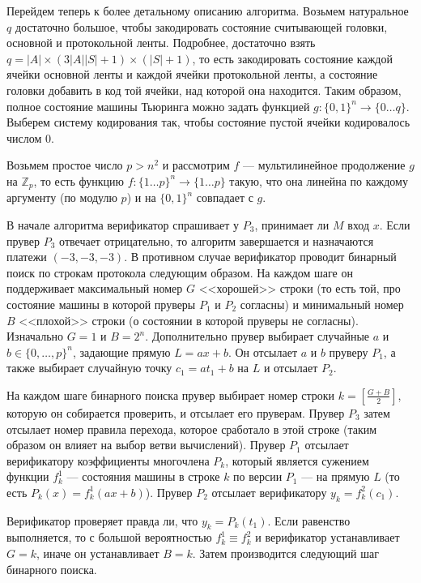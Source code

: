 \documentclass{mipt-thesis-bs}
\theoremstyle{plain}
\theoremstyle{definition}
\begin{document}
Перейдем теперь к более детальному описанию алгоритма. Возьмем натуральное $q$ достаточно большое, чтобы закодировать состояние считывающей головки, основной и протокольной ленты. Подробнее, достаточно взять $q = |A| \times (3|A||S| + 1) \times (|S| + 1)$, то есть закодировать состояние каждой ячейки основной ленты и каждой ячейки протокольной ленты, а состояние головки добавить в код той ячейки, над которой она находится. Таким образом, полное состояние машины Тьюринга можно задать функцией $g: \{0, 1\}^n \longrightarrow \{0\ldots q\}$. Выберем систему кодирования так, чтобы состояние пустой ячейки кодировалось числом 0.

Возьмем простое число $p > n^2$ и рассмотрим $f$ --- мультилинейное продолжение $g$ на $\mathbb{Z}_p$, то есть функцию $f: \{1\ldots p\}^n \longrightarrow \{1 \ldots p\}$ такую, что она линейна по каждому аргументу (по модулю $p$) и на $\{0, 1\}^n$ совпадает с $g$.

В начале алгоритма верификатор спрашивает у $P_3$, принимает ли $M$ вход $x$. Если прувер $P_3$ отвечает отрицательно, то алгоритм завершается и назначаются платежи $(-3, -3, -3)$.
В противном случае верификатор проводит бинарный поиск по строкам протокола следующим образом. На каждом шаге он поддерживает максимальный номер $G$ <<хорошей>> строки (то есть той, про состояние машины в которой пруверы $P_1$ и $P_2$ согласны) и минимальный номер $B$ <<плохой>> строки (о состоянии в которой пруверы не согласны). Изначально $G=1$ и $B=2^n$. Дополнительно прувер выбирает случайные $a$ и $b \in \{0, \ldots, p\}^n$, задающие прямую $L=ax + b$. Он отсылает $a$ и $b$ пруверу $P_1$, а также выбирает случайную точку $c_1 = a t_1 + b$ на $L$ и отсылает $P_2$.

На каждом шаге бинарного поиска прувер выбирает номер строки $k = \left[\frac{G + B}{2}\right]$, которую он собирается проверить, и отсылает его пруверам. Прувер $P_3$ затем отсылает номер правила перехода, которое сработало в этой строке (таким образом он влияет на выбор ветви вычислений).
Прувер $P_1$ отсылает верификатору коэффициенты многочлена $P_k$, который является сужением функции $f^1_k$ --- состояния машины в строке $k$ по версии $P_1$ --- на прямую $L$ (то есть $P_k(x) = f^1_k(ax + b)$). Прувер $P_2$ отсылает верификатору $y_k = f^2_k(c_1)$.

Верификатор проверяет правда ли, что $y_k = P_k(t_1)$. Если равенство выполняется, то с большой вероятностью $f^1_k \equiv f^2_k$ и верификатор устанавливает $G = k$, иначе он устанавливает $B = k$. Затем производится следующий шаг бинарного поиска.
\end{document}
